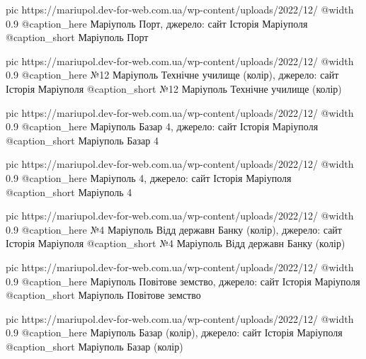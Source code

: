   pic https://mariupol.dev-for-web.com.ua/wp-content/uploads/2022/12/%
  @width 0.9
  @caption_here Маріуполь Порт, джерело: сайт Історія Маріуполя
  @caption_short Маріуполь Порт

  pic https://mariupol.dev-for-web.com.ua/wp-content/uploads/2022/12/%
  @width 0.9
  @caption_here №12 Маріуполь Технічне училище (колір), джерело: сайт Історія Маріуполя
  @caption_short №12 Маріуполь Технічне училище (колір)

  pic https://mariupol.dev-for-web.com.ua/wp-content/uploads/2022/12/%
  @width 0.9
  @caption_here Маріуполь Базар 4, джерело: сайт Історія Маріуполя
  @caption_short Маріуполь Базар 4

  pic https://mariupol.dev-for-web.com.ua/wp-content/uploads/2022/12/%
  @width 0.9
  @caption_here Маріуполь 4, джерело: сайт Історія Маріуполя
  @caption_short Маріуполь 4

  pic https://mariupol.dev-for-web.com.ua/wp-content/uploads/2022/12/%
  @width 0.9
  @caption_here №4 Маріуполь Відд державн Банку (колір), джерело: сайт Історія Маріуполя
  @caption_short №4 Маріуполь Відд державн Банку (колір)

  pic https://mariupol.dev-for-web.com.ua/wp-content/uploads/2022/12/%
  @width 0.9
  @caption_here Маріуполь Повітове земство, джерело: сайт Історія Маріуполя
  @caption_short Маріуполь Повітове земство

  pic https://mariupol.dev-for-web.com.ua/wp-content/uploads/2022/12/%
  @width 0.9
  @caption_here Маріуполь Базар (колір), джерело: сайт Історія Маріуполя
  @caption_short Маріуполь Базар (колір)

